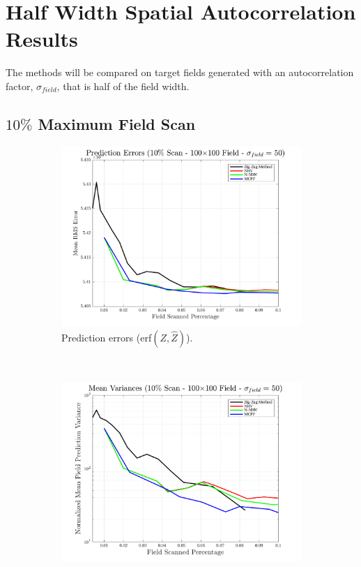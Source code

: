 \section{Half Width Spatial Autocorrelation Results}
The methods will be compared on target fields generated with an autocorrelation factor, $\sigma_{field}$, that is half of the field width.

\clearpage
\subsection{$10\%$ Maximum Field Scan}
\begin{figure}[htb!]
    \centering
    \begin{subfigure}[t]{0.65\textwidth}
        \centering
        \includegraphics[width=\linewidth]{figures/hbresults/pred_errs_10p_100x100_sf_50_seed_3.png}
        \captionsetup{skip=0.20\baselineskip,size=footnotesize}
        \caption{Prediction errors (erf$(Z,\hat{Z})$).}
        \label{fig:prederrs_sigma50_p10_s3}
    \end{subfigure}%
    \\
    \begin{subfigure}[t]{0.65\textwidth}
        \centering
        \includegraphics[width=\linewidth]{figures/hbresults/vars_10p_100x100_sf_50_seed_3.png}

\end{subfigure}
\end{figure}
